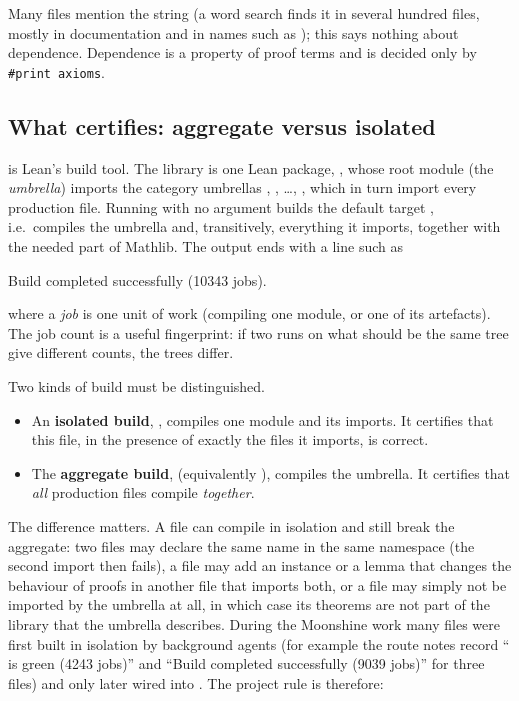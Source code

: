 Many files mention the string  (a word search finds it in several hundred files, mostly
in documentation and in names such as ); this says nothing about dependence.
Dependence is a property of proof terms and is decided only by \texttt{\#print axioms}.

\subsection{What \texorpdfstring{}{lake build} certifies: aggregate versus isolated}\label{ch15:sec:build}

 is Lean's build tool. The library is one Lean package, , whose root module
 (the \emph{umbrella}) imports the category umbrellas
, , \ldots, ,
which in turn import every production file. Running  with no argument builds the
default target , i.e.\ compiles the umbrella and, transitively, everything it imports,
together with the needed part of Mathlib. The output ends with a line such as
\begin{plaincode}
Build completed successfully (10343 jobs).
\end{plaincode}
where a \emph{job} is one unit of work (compiling one module, or one of its artefacts). The job
count is a useful fingerprint: if two runs on what should be the same tree give different counts,
the trees differ.

Two kinds of build must be distinguished.
\begin{itemize}
\item An \textbf{isolated build}, , compiles one module and
  its imports. It certifies that this file, in the presence of exactly the files it imports, is
  correct.
\item The \textbf{aggregate build},  (equivalently ),
  compiles the umbrella. It certifies that \emph{all} production files compile \emph{together}.
\end{itemize}
The difference matters. A file can compile in isolation and still break the aggregate: two files
may declare the same name in the same namespace (the second import then fails), a file may add an
instance or a  lemma that changes the behaviour of proofs in another file that imports
both, or a file may simply not be imported by the umbrella at all, in which case its theorems are
not part of the library that the umbrella describes. During the Moonshine work many files were first
built in isolation by background agents (for example the route notes record
`` is green (4243 jobs)'' and ``Build completed successfully
(9039 jobs)'' for three  files) and only later wired into
. The project rule is therefore:


